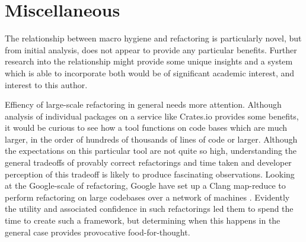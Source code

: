 \section{Miscellaneous}


The relationship between macro hygiene and refactoring is particularly novel, but from initial analysis, does not appear to provide any particular benefits. Further research into the relationship might provide some unique insights and a system which is able to incorporate both would be of significant academic interest, and interest to this author.

Effiency of large-scale refactoring in general needs more attention. Although analysis of individual packages on a service like Crates.io provides some benefits, it would be curious to see how a tool functions on code bases which are much larger, in the order of hundreds of thousands of lines of code or larger. Although the expectations on this particular tool are not quite so high, understanding the general tradeoffs of provably correct refactorings and time taken and developer perception of this tradeoff is likely to produce fascinating observations. Looking at the Google-scale of refactoring, Google have set up a Clang map-reduce to perform refactoring on large codebases over a network of machines \cite{carruth2011clang}. Evidently the utility and associated confidence in such refactorings led them to spend the time to create such a framework, but determining when this happens in the general case provides provocative food-for-thought.

